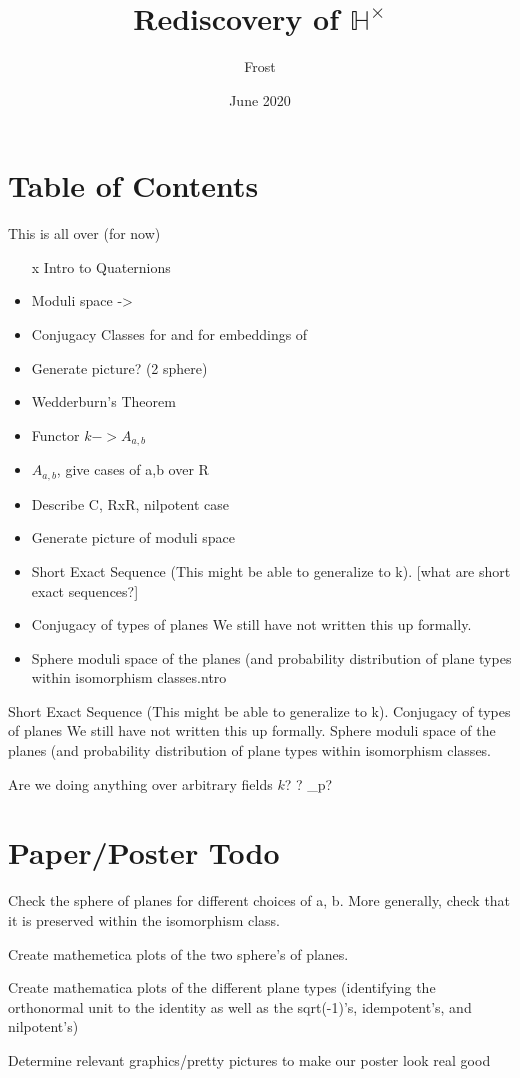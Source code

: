 \documentclass{article}
\title{Rediscovery of $\mathbb{H}^\times$}
\author{Frost}
\date{June 2020}
\newcommand{\xmark}{\ding{55}}%
\newcommand{\wontfix}{\rlap{$\square$}{\large\hspace{1pt}\xmark}}
\begin{document}
\maketitle
\section{Table of Contents}
This is all over \bR (for now)
\begin{itemize}
    \item [x] Intro to Quaternions
    \item Moduli space \bC->\bH
    \item Conjugacy Classes for \bH and for embeddings of \bC
    \item Generate picture? (2 sphere)
    \item Wedderburn's Theorem
    \item Functor $k->A_{a,b}$
    \item $A_{a,b}$, give cases of  a,b over R
    \item Describe C, RxR, nilpotent case
    \item Generate picture of moduli space
    
    \item Short Exact Sequence (This might be able to generalize to k). [what are short exact sequences?]
    \item Conjugacy of types of planes {\color{blue} We still have not written this up formally}. 
    \item Sphere moduli space of the planes (and probability distribution of plane types within isomorphism classes.ntro
\end{itemize}

Short Exact Sequence (This might be able to generalize to k). 
Conjugacy of types of planes {\color{blue} We still have not written this up formally}. 
Sphere moduli space of the planes (and probability distribution of plane types within isomorphism classes.

Are we doing anything over arbitrary fields $k$? \bQ? {\bQ}_p?

\section{Paper/Poster Todo}
\begin{todolist}
    \item[\wontfix] Check the sphere of planes for different choices of a, b. More generally, check that it is preserved within the isomorphism class.
    \item Create mathemetica plots of the two sphere's of planes.
    \item Create mathematica plots of the different plane types (identifying the orthonormal unit to the identity as well as the sqrt(-1)'s, idempotent's, and nilpotent's)
    \item Determine relevant graphics/pretty pictures to make our poster look real good
\end{todolist}
\end{document}
